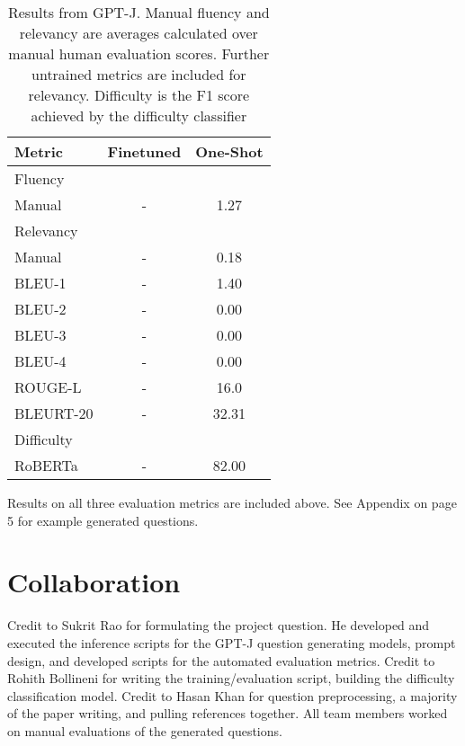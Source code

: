 \documentclass[11pt]{article}
\begin{document}
\begin{table}[h]
\centering
\begin{tabular}{lcc}
\hline
\textbf{Metric} & \textbf{Finetuned} & \textbf{One-Shot}\\
\hline
Fluency & & \\ 
\hspace{0.5cm} Manual & - & 1.27 \\
Relevancy & & \\
\hspace{0.5cm} Manual & - & 0.18 \\
\hspace{0.5cm} BLEU-1 & - & 1.40 \\
\hspace{0.5cm} BLEU-2 & - & 0.00 \\
\hspace{0.5cm} BLEU-3 & - & 0.00 \\
\hspace{0.5cm} BLEU-4 & - & 0.00 \\
\hspace{0.5cm} ROUGE-L & - & 16.0 \\
\hspace{0.5cm} BLEURT-20 & - & 32.31 \\
Difficulty & & \\
\hspace{0.5cm} RoBERTa & - & 82.00 \\
\hline
\end{tabular}
\caption{\label{citation-guide}
Results from GPT-J. Manual fluency and relevancy are averages calculated over manual human evaluation scores. Further untrained metrics are included for relevancy. Difficulty is the F1 score achieved by the difficulty classifier  
}
\end{table}

Results on all three evaluation metrics are included above. See Appendix on page 5 for example generated questions. 

\section{Collaboration}
Credit to Sukrit Rao for formulating the project question. He developed and executed the inference scripts for the GPT-J question generating models, prompt design, and developed scripts for the automated evaluation metrics.
Credit to Rohith Bollineni for writing the training/evaluation script, building the difficulty classification model.
Credit to Hasan Khan for question preprocessing, a majority of the paper writing, and pulling references together. All team members worked on manual evaluations of the generated questions. 
\end{document}
